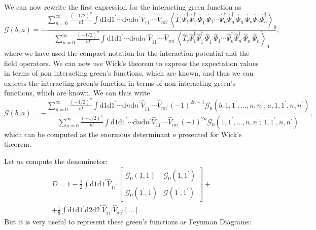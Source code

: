 We can now rewrite the first expression for the interacting green function as
\[
    \mathcal{G}(b,a) = - \frac{\sum_{n=0}^{\infty} \frac{(-1/2)^n}{n!} \int \mathrm{d}1 \mathrm{d}1^{\prime} \cdots \mathrm{d}n \mathrm{d}n^{\prime} \hat{V}_{11^{\prime}} \cdots \hat{V}_{n n^{\prime}} \left\langle \hat{T}_{\tau} \hat{\Psi}_1^\dagger \hat{\Psi}_{1^{\prime}}^\dagger \hat{\Psi}_{1^{\prime}} \hat{\Psi}_{1} \cdots \hat{\Psi}_n^\dagger \hat{\Psi}_{n^{\prime}}^\dagger \hat{\Psi}_{n^{\prime}} \hat{\Psi}_{n} \hat{\Psi}_b \hat{\Psi}^\dagger_a \right\rangle_0}{\sum_{n=0}^{\infty} \frac{(-1/2)^n}{n!} \int \mathrm{d}1 \mathrm{d}1^{\prime} \cdots \mathrm{d}n \mathrm{d}n^{\prime} \hat{V}_{11^{\prime}} \cdots \hat{V}_{n n^{\prime}} \left\langle \hat{T}_{\tau} \hat{\Psi}_1^\dagger \hat{\Psi}_{1^{\prime}}^\dagger \hat{\Psi}_{1^{\prime}} \hat{\Psi}_{1}\cdots \hat{\Psi}_n^\dagger \hat{\Psi}_{n^{\prime}}^\dagger \hat{\Psi}_{n^{\prime}} \hat{\Psi}_{n}\right\rangle_0},
\]
where we have used the compact notation for the interaction potential and the field operators. We can now use Wick's theorem to express the expectation values in terms of non interacting green's functions, which are known, and thus we can express the interacting green's function in terms of non interacting green's functions, which are known. We can thus write
\[
    \mathcal{G}(b,a) = - \frac{\sum_{n=0}^{\infty} \frac{(-1/2)^n}{n!} \int \mathrm{d}1 \mathrm{d}1^{\prime} \cdots \mathrm{d}n \mathrm{d}n^{\prime} \hat{V}_{11^{\prime}} \cdots \hat{V}_{n n^{\prime}} (-1)^{2n+1} \mathcal{G}_0 (b, 1, 1^{\prime} , \dots, n, n^{\prime} ;\, a, 1, 1^{\prime}, n, n^{\prime})}{\sum_{n=0}^{\infty} \frac{(-1/2)^n}{n!} \int \mathrm{d}1 \mathrm{d}1^{\prime} \cdots \mathrm{d}n \mathrm{d}n^{\prime} \hat{V}_{11^{\prime}} \cdots \hat{V}_{n n^{\prime}} (-1)^{2n} \mathcal{G}_0 (1, 1^{\prime} , \dots, n, n^{\prime} ;\,1, 1^{\prime}, n, n^{\prime})},
\]
which can be computed as the enormous determinant e presented for Wick's theorem.

Let us compute the denominetor:
\[
    \begin{aligned}
        D = 1 - \frac{1}{2}\int \mathrm{d} 1 \mathrm{d} 1^{\prime} \hat{V}_{11^{\prime}} \begin{bmatrix}
                                                                                             \mathcal{G}_0(1,1)          & \mathcal{G}_0(1,1^{\prime})         \\
                                                                                             \mathcal{G}_0(1^{\prime},1) & \mathcal{G}(1^{\prime}, 1^{\prime})
                                                                                         \end{bmatrix} + \\
        + \frac{1}{8} \int \mathrm{d} 1 \mathrm{d} 1^{\prime} \mathrm{d}2 \mathrm{d}2^{\prime} \hat{V}_{11^{\prime}}\hat{V}_{22^{\prime}} [\dots].
    \end{aligned}
\]
But it is very useful to represent these green's functions as Feynman Diagrams:

